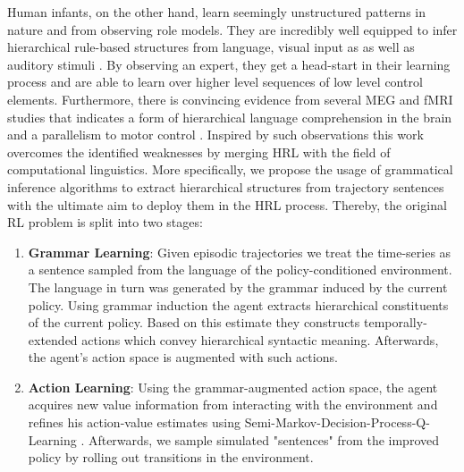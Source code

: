 \documentclass[colorinlistoftodos]{article}
\theoremstyle{definition}
\begin{document}
Human infants, on the other hand, learn seemingly unstructured patterns in nature and from observing role models. They are incredibly well equipped to infer hierarchical rule-based structures from language, visual input as as well as auditory stimuli \citep{Marcus_1999, Frank_2009, Marcus_2007}. By observing an expert, they get a head-start in their learning process and are able to learn over higher level sequences of low level control elements. Furthermore, there is convincing evidence from several MEG and fMRI studies that indicates a form of hierarchical language comprehension in the brain \citep{Ding_2017, Frank_2018, Brennan_2016, Nelson_2017} and a parallelism to motor control \citep{Pastra_2012, Stout_2018}.
Inspired by such observations this work overcomes the identified weaknesses by merging HRL with the field of computational linguistics. More specifically, we propose the usage of grammatical inference algorithms to extract hierarchical structures from trajectory sentences with the ultimate aim to deploy them in the HRL process. Thereby, the original RL problem is split into two stages:

\begin{enumerate}
	\item \textbf{Grammar Learning}: Given episodic trajectories we treat the time-series as a sentence sampled from the language of the policy-conditioned environment. The language in turn was generated by the grammar induced by the current policy. Using grammar induction the agent extracts hierarchical constituents of the current policy. Based on this estimate they constructs temporally-extended actions which convey hierarchical syntactic meaning. Afterwards, the agent's action space is augmented with such actions. 
	\item \textbf{Action Learning}: Using the grammar-augmented action space, the agent acquires new value information from interacting with the environment and refines his action-value estimates using Semi-Markov-Decision-Process-Q-Learning \citep{Bradtke_1995}. Afterwards, we sample simulated "sentences" from the improved policy by rolling out transitions in the environment.
\end{enumerate}
\end{document}
